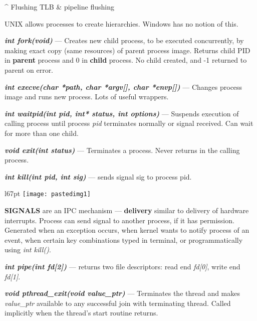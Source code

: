 \^{} Flushing TLB \& pipeline flushing

\hSep

\textcolor{cornellred}{UNIX allows processes to create hierarchies.} 
\textcolor{ceruleanblue}{Windows has no notion of this.}

\textcolor{cornellred}{
\textit{\textbf{int fork(void)}} — Creates new child process, to be executed
concurrently, by making exact copy (same resources) of
parent process image. Returns child PID in \textbf{parent} process
and 0 in \textbf{child} process. No child created, and -1
returned to parent on error.}

\textcolor{cornellred}{
\textit{\textbf{int execve(char *path, char *argv[], char *envp[])}} — Changes process image and runs new
process. Lots of useful wrappers.}

\textcolor{cornellred}{
\textit{\textbf{int waitpid(int pid, int* status, int options)}} — Suspends execution of calling process
until process \textit{pid} terminates normally or signal received.
Can wait for more than one child.}


\textcolor{cornellred}{
\textit{\textbf{void exit(int status)}} — Terminates a process. Never returns in the
calling process.}

\textcolor{cornellred}{
\textit{\textbf{int kill(int pid, int sig)}} — sends signal sig to process pid.}

\hSep

\begin{wrapfigure}[9]{l}{67pt}
\vspace{-12pt}
\texttt{[image: pastedimg1]}
\end{wrapfigure}

\textcolor{cornellred}{\textbf{SIGNALS}} are an IPC mechanism — 
\textbf{delivery} similar
to delivery of hardware interrupts. Process can send signal to
another process, if it has permission. Generated when an
exception occurs, when kernel wants to notify process of
an event, when certain key combinations typed in terminal, 
or programmatically using \textcolor{cornellred}{\textit{int kill()}}.



\textcolor{cornellred}{\textit{\textbf{int pipe(int fd[2])}} — 
returns two file descriptors: 
read end \textit{fd[0]}, write end \textit{fd[1]}.}

\hSep


\textcolor{cornellred}{\textit{\textbf{void pthread\_exit(void \*value\_ptr)}} — 
Terminates the thread and makes \textit{value\_ptr} available to any successful join with terminating thread.
Called implicitly when the thread's start routine returns.}


\hSep